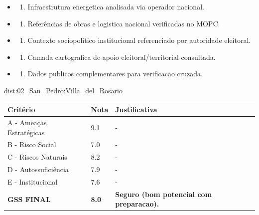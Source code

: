 {\begin{itemize}
\item
  \begin{enumerate}
  \def\labelenumi{\arabic{enumi})}
  \setcounter{enumi}{7}
  \tightlist
  \item
    Infraestrutura energetica analisada via operador nacional.
  \end{enumerate}
\item
  \begin{enumerate}
  \def\labelenumi{\arabic{enumi})}
  \setcounter{enumi}{8}
  \tightlist
  \item
    Referências de obras e logistica nacional verificadas no MOPC.
  \end{enumerate}
\item
  \begin{enumerate}
  \def\labelenumi{\arabic{enumi})}
  \setcounter{enumi}{9}
  \tightlist
  \item
    Contexto sociopolitico institucional referenciado por autoridade
    eleitoral.
  \end{enumerate}
\item
  \begin{enumerate}
  \def\labelenumi{\arabic{enumi})}
  \setcounter{enumi}{10}
  \tightlist
  \item
    Camada cartografica de apoio eleitoral/\allowbreak territorial consultada.
  \end{enumerate}
\item
  \begin{enumerate}
  \def\labelenumi{\arabic{enumi})}
  \setcounter{enumi}{11}
  \tightlist
  \item
    Dados publicos complementares para verificacao cruzada.
  \end{enumerate}
\end{itemize}}{dist:02_San_Pedro:Villa_del_Rosario}
\begin{table}[ht!]
\small \begin{tabular}{p{3.0cm}p{0.8cm}p{6.0cm}} \toprule
\textbf{Critério} & \textbf{Nota} & \textbf{Justificativa} \\ \midrule
A - Ameaças Estratégicas & 9.1 & - \\
B - Risco Social & 7.0 & - \\
C - Riscos Naturais & 8.2 & - \\
D - Autossuficiência & 7.9 & - \\
E - Institucional & 7.6 & - \\
\midrule \textbf{GSS FINAL} & \textbf{8.0} & \textbf{Seguro (bom potencial com preparacao).} \\ \bottomrule \end{tabular}
\end{table}
